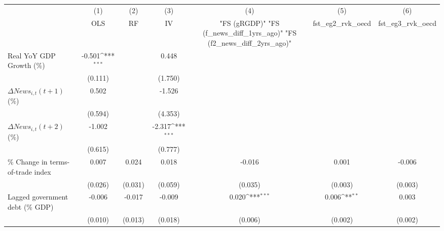 {
\def\sym#1{\ifmmode^{#1}\else\(^{#1}\)\fi}
\begin{tabular}{l*{6}{c}}
\toprule
                    &\multicolumn{1}{c}{(1)}&\multicolumn{1}{c}{(2)}&\multicolumn{1}{c}{(3)}&\multicolumn{1}{c}{(4)}&\multicolumn{1}{c}{(5)}&\multicolumn{1}{c}{(6)}\\
                    &\multicolumn{1}{c}{OLS}&\multicolumn{1}{c}{RF}&\multicolumn{1}{c}{IV}&\multicolumn{1}{c}{ "FS (gRGDP)"  "FS (f_news_diff_1yrs_ago)"  "FS (f2_news_diff_2yrs_ago)" }&\multicolumn{1}{c}{fst_eg2_rvk_oecd}&\multicolumn{1}{c}{fst_eg3_rvk_oecd}\\
\midrule
Real YoY GDP Growth (\%)&      -0.501\sym{***}&                     &       0.448         &                     &                     &                     \\
                    &     (0.111)         &                     &     (1.750)         &                     &                     &                     \\
\addlinespace
$ \Delta News_{i,t}(t+1)$ (\%)&       0.502         &                     &      -1.526         &                     &                     &                     \\
                    &     (0.594)         &                     &     (4.353)         &                     &                     &                     \\
\addlinespace
$ \Delta News_{i,t}(t+2)$ (\%)&      -1.002         &                     &      -2.317\sym{***}&                     &                     &                     \\
                    &     (0.615)         &                     &     (0.777)         &                     &                     &                     \\
\addlinespace
\% Change in terms-of-trade index&       0.007         &       0.024         &       0.018         &      -0.016         &       0.001         &      -0.006         \\
                    &     (0.026)         &     (0.031)         &     (0.059)         &     (0.035)         &     (0.003)         &     (0.003)         \\
\addlinespace
Lagged government debt (\% GDP)&      -0.006         &      -0.017         &      -0.009         &       0.020\sym{***}&       0.006\sym{**} &       0.003         \\
                    &     (0.010)         &     (0.013)         &     (0.018)         &     (0.006)         &     (0.002)         &     (0.002)         \\

\end{tabular}}
